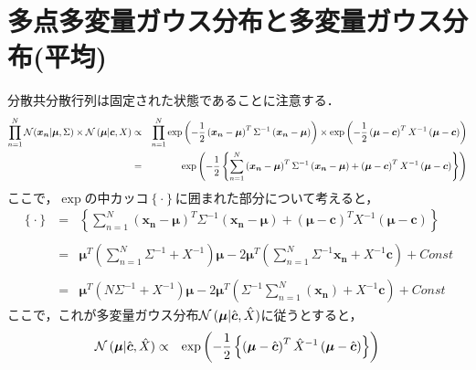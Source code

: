 \documentclass[a4j]{jarticle}
\begin{document}
\section{多点多変量ガウス分布と多変量ガウス分布(平均)}
分散共分散行列は固定された状態であることに注意する．
\begin{eqnarray}
\prod_{n=1}^{N}{\operatorname{\mathcal{N}}(\boldsymbol{x_n} | \boldsymbol{\mu}, \Sigma)}
\times
\operatorname{\mathcal{N}}{(\boldsymbol{\mu} | \boldsymbol{c}, X)}
&\propto&
\prod_{n=1}^{N}{\exp{\left( -\frac{1}{2} \left( \boldsymbol{x_n} - \boldsymbol{\mu}\right)^T \Sigma^{-1} \left( \boldsymbol{x_n} - \boldsymbol{\mu}\right) \right)}}
\times
\exp{\left( -\frac{1}{2} \left( \boldsymbol{\mu} - \boldsymbol{c}\right)^T X^{-1} \left( \boldsymbol{\mu} - \boldsymbol{c}\right) \right)} \nonumber \\
&=&
\exp{\left( -\frac{1}{2}\left\{ \sum_{n=1}^{N}{ \left(\boldsymbol{x_n} - \boldsymbol{\mu}\right)^T \Sigma^{-1} \left( \boldsymbol{x_n} - \boldsymbol{\mu}\right) } + \left( \boldsymbol{\mu} - \boldsymbol{c}\right)^T X^{-1} \left( \boldsymbol{\mu} - \boldsymbol{c}\right) \right\}  \right)}
\end{eqnarray}
ここで，$\exp$の中カッコ$\left\{\cdot\right\}$に囲まれた部分について考えると，
\begin{eqnarray}
\left\{ \cdot \right\}
&=&
\left\{ \sum_{n=1}^{N}{ \left(\boldsymbol{x_n} - \boldsymbol{\mu}\right)^T \Sigma^{-1} \left( \boldsymbol{x_n} - \boldsymbol{\mu}\right) } + \left( \boldsymbol{\mu} - \boldsymbol{c}\right)^T X^{-1} \left( \boldsymbol{\mu} - \boldsymbol{c}\right) \right\} \\
&&\nonumber\\
&=&
\boldsymbol{\mu}^T \left(\sum_{n=1}^{N}{\Sigma^{-1}} + X^{-1}\right)\boldsymbol{\mu} -2\boldsymbol{\mu}^T \left(\sum_{n=1}^{N}{\Sigma^{-1}\boldsymbol{x_n}} + X^{-1}\boldsymbol{c} \right) + Const \\
&& \nonumber \\
&=&
\boldsymbol{\mu}^T \left(N \Sigma^{-1} + X^{-1}\right)\boldsymbol{\mu} -2\boldsymbol{\mu}^T \left(\Sigma^{-1}\sum_{n=1}^{N}{(\boldsymbol{x_n})} + X^{-1}\boldsymbol{c} \right) + Const
\end{eqnarray}
ここで，これが多変量ガウス分布$\operatorname{\mathcal{N}}{(\boldsymbol{\mu} | \hat{\boldsymbol{c}} , \hat{X})}$に従うとすると，
\begin{eqnarray}
\operatorname{\mathcal{N}}{(\boldsymbol{\mu} | \hat{\boldsymbol{c}} , \hat{X})}
&\propto&
\exp{\left( -\frac{1}{2} \left\{ \left( \boldsymbol{\mu} - \hat{\boldsymbol{c}}\right)^T \hat{X}^{-1} \left( \boldsymbol{\mu} - \hat{\boldsymbol{c}}\right) \right\} \right)}
\end{eqnarray}
\end{document}
